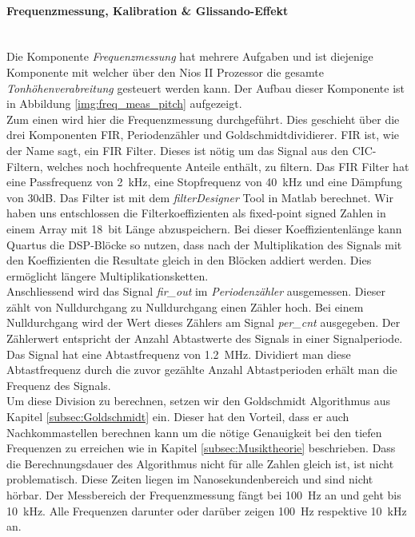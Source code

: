 \newpage

\paragraph{Frequenzmessung, Kalibration \& Glissando-Effekt}\mbox{}\\

Die Komponente \textit{Frequenzmessung} hat mehrere Aufgaben und ist diejenige Komponente mit welcher über den Nios II Prozessor die gesamte \textit{Tonhöhenverabreitung} gesteuert werden kann. Der Aufbau dieser Komponente ist in Abbildung \ref{img:freq_meas_pitch} aufgezeigt.\\
Zum einen wird hier die Frequenzmessung durchgeführt. Dies geschieht über die drei Komponenten FIR, Periodenzähler und Goldschmidtdividierer. FIR ist, wie der Name sagt, ein FIR Filter. Dieses ist nötig um das Signal aus den CIC-Filtern, welches noch hochfrequente Anteile enthält, zu filtern. Das FIR Filter hat eine Passfrequenz von \SI{2}{kHz}, eine Stopfrequenz von \SI{40}{kHz} und eine Dämpfung von 30dB. Das Filter ist mit dem \textit{filterDesigner} Tool in Matlab berechnet. Wir haben uns entschlossen die Filterkoeffizienten als fixed-point signed Zahlen in einem Array mit \SI{18}{bit} Länge abzuspeichern. Bei dieser Koeffizientenlänge kann Quartus die DSP-Blöcke so nutzen, dass nach der Multiplikation des Signals mit den Koeffizienten die Resultate gleich in den Blöcken addiert werden. Dies ermöglicht längere Multiplikationsketten. \cite{Cyclone_V}\\
Anschliessend wird das Signal \textit{fir\_out} im \textit{Periodenzähler} ausgemessen. Dieser zählt von Nulldurchgang zu Nulldurchgang einen Zähler hoch. Bei einem Nulldurchgang wird der Wert dieses Zählers am Signal \textit{per\_cnt} ausgegeben. Der Zählerwert entspricht der Anzahl Abtastwerte des Signals in einer Signalperiode. \\
Das Signal hat eine Abtastfrequenz von \SI{1.2}{MHz}. Dividiert man diese Abtastfrequenz durch die zuvor gezählte Anzahl Abtastperioden erhält man die Frequenz des Signals.\\ Um diese Division zu berechnen, setzen wir den Goldschmidt Algorithmus aus Kapitel \ref{subsec:Goldschmidt} ein. Dieser hat den Vorteil, dass er auch Nachkommastellen berechnen kann um die nötige Genauigkeit bei den tiefen Frequenzen zu erreichen wie in Kapitel \ref{subsec:Musiktheorie} beschrieben. Dass die Berechnungsdauer des Algorithmus nicht für alle Zahlen gleich ist, ist nicht problematisch. Diese Zeiten liegen im Nanosekundenbereich und sind nicht hörbar. Der Messbereich der Frequenzmessung fängt bei \SI{100}{Hz} an und geht bis \SI{10}{kHz}. Alle Frequenzen darunter oder darüber zeigen \SI{100}{Hz} respektive \SI{10}{kHz} an.

